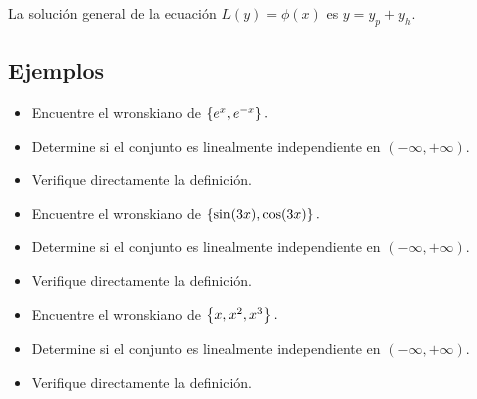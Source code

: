 	\begin{thm}
		\label{bron:thm:8.4}
		La soluci\'on general de la ecuaci\'on $L(y)=\phi(x)$ es $y=y_{p}+y_{h}.$
	\end{thm}
	


\subsection{Ejemplos}


	\begin{problema}
		\begin{itemize}
			\item Encuentre el wronskiano de $\left\{ e^{x},e^{-x} \right\}.$
			
			\item Determine si el conjunto es linealmente independiente en $(-\infty,+\infty).$
			
			\item Verifique directamente la definición.
		\end{itemize}
		
	\end{problema}
	



	\begin{problema}
		\begin{itemize}
			\item Encuentre el wronskiano de $\left\{ \sin(3x), \cos(3x) \right\}.$
			\item Determine si el conjunto es linealmente independiente en $(-\infty,+\infty).$
			
			\item Verifique directamente la definición.
		\end{itemize}
		
	\end{problema}
	



	\begin{problema}
		\begin{itemize}
			\item Encuentre el wronskiano de $\left\{ x,x^{2}, x^{3} \right\}.$
			
			\item Determine si el conjunto es linealmente independiente en $(-\infty,+\infty).$
			
			\item Verifique directamente la definición.
		\end{itemize}
	\end{problema}
	



